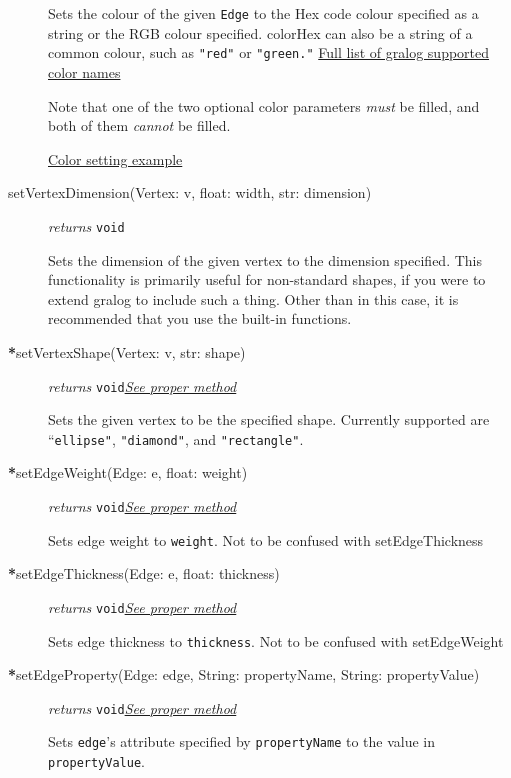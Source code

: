 \begin{description}
Sets the colour of the given \texttt{Edge} to the Hex code colour
specified as a string or the RGB colour specified. colorHex can also be
a string of a common colour, such as \texttt{"red"} or
\texttt{"green."} \hyperref[colorNamesSupportedByGralog]{Full list of gralog supported color names}

Note that one of the two optional color parameters \textit{must} be filled, and both of them \textit{cannot} be filled.

\hyperref[colorNamesSupportedByGralog]{Color setting example}



  
\item[setVertexDimension(Vertex: v, float: width, str: dimension)]\emph{returns} \texttt{void}

Sets the dimension of the given vertex to the dimension specified. This functionality is primarily useful for non-standard shapes, if you were to extend gralog to include such a thing. Other than in this case, it is recommended that you use the built-in functions.

\item[\textbf{*}setVertexShape(Vertex: v, str: shape)] \emph{returns} \texttt{void}\quad \hyperref[setVertexShapeClass]{\textit{See proper method}}


Sets the given vertex to be the specified shape. Currently supported
are ``\texttt{ellipse"}, \texttt{"diamond"}, and \texttt{"rectangle"}.

\item[\textbf{*}setEdgeWeight(Edge: e, float: weight)] \emph{returns} \texttt{void}\quad \hyperref[setEdgeWeightClass]{\textit{See proper method}}


Sets edge weight to \texttt{weight}. Not to be confused with setEdgeThickness

\item[\textbf{*}setEdgeThickness(Edge: e, float: thickness)] \emph{returns} \texttt{void}\quad \hyperref[setEdgeThiccnessClass]{\textit{See proper method}}


Sets edge thickness to \texttt{thickness}. Not to be confused with setEdgeWeight

\item[\textbf{*}setEdgeProperty(Edge: edge, String: propertyName, String: propertyValue)] \emph{returns} \texttt{void}\quad \hyperref[setEdgePropertyClass]{\textit{See proper method}}


Sets \texttt{edge}'s attribute specified by \texttt{propertyName} to the value in \texttt{propertyValue}.


\end{description}
